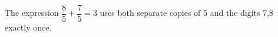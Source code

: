 The expression $\boxed{\dfrac{8}{5}+\dfrac{7}{5}=3}$ uses both separate copies of 5 and the digits 7,8 exactly once.
